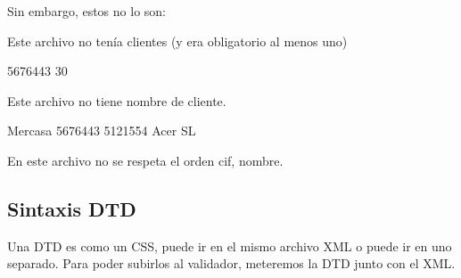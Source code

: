 \documentclass[letterpaper,10pt,spanish]{sphinxmanual}
\begin{document}
Sin embargo, estos no lo son:

\begin{sphinxVerbatim}[commandchars=\\\{\}]
\end{sphinxVerbatim}

Este archivo no tenía clientes (y era obligatorio al menos uno)

\begin{sphinxVerbatim}[commandchars=\\\{\}]
                5676443
                30
\end{sphinxVerbatim}

Este archivo no tiene nombre de cliente.

\begin{sphinxVerbatim}[commandchars=\\\{\}]
                Mercasa
                5676443
                5121554
                Acer SL
\end{sphinxVerbatim}

En este archivo no se respeta el orden cif, nombre.


\subsection{Sintaxis DTD}
\label{\detokenize{tema5:sintaxis-dtd}}
Una DTD es como un CSS, puede ir en el mismo archivo XML o puede ir en uno separado. Para poder subirlos al validador, meteremos la DTD junto con el XML.
\end{document}
